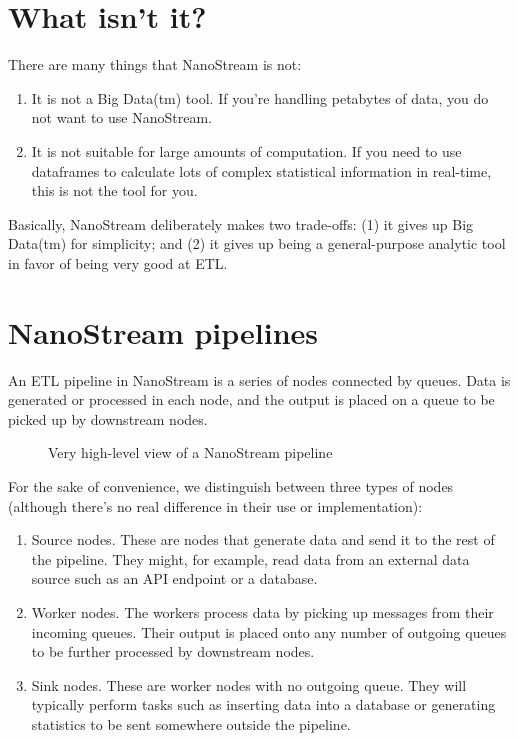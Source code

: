 \documentclass[letterpaper,10pt,english]{sphinxmanual}
\let\sphinxpxdimen\pdfpxdimen\else\newdimen\sphinxpxdimen
\begin{document}
\section{What isn’t it?}
\label{\detokenize{treehorn:what-isn-t-it}}
There are many things that NanoStream is not:
\begin{enumerate}
\def\theenumi{\arabic{enumi}}
\def\labelenumi{\theenumi .}
\makeatletter\def\p@enumii{\p@enumi \theenumi .}\makeatother
\item {} 
It is not a Big Data(tm) tool. If you’re handling petabytes of data, you do
not want to use NanoStream.

\item {} 
It is not suitable for large amounts of computation. If you need to use
dataframes to calculate lots of complex statistical information in real-time,
this is not the tool for you.

\end{enumerate}

Basically, NanoStream deliberately makes two trade-offs: (1) it gives up Big Data(tm) for simplicity; and (2) it gives up being a general-purpose analytic tool in favor of being very good at ETL.


\section{NanoStream pipelines}
\label{\detokenize{treehorn:nanostream-pipelines}}
An ETL pipeline in NanoStream is a series of nodes connected by queues. Data
is generated or processed in each node, and the output is placed on a queue to
be picked up by downstream nodes.

\begin{figure}[htbp]
\centering
\capstart

\noindent\sphinxincludegraphics[width=600\sphinxpxdimen]{{30k_view}.png}
\caption{Very high-level view of a NanoStream pipeline}\label{\detokenize{treehorn:id1}}\end{figure}

For the sake of convenience, we distinguish between three types of nodes
(although there’s no real difference in their use or implementation):
\begin{enumerate}
\def\theenumi{\arabic{enumi}}
\def\labelenumi{\theenumi .}
\makeatletter\def\p@enumii{\p@enumi \theenumi .}\makeatother
\item {} 
Source nodes. These are nodes that generate data and send it to the rest
of the pipeline. They might, for example, read data from an external
data source such as an API endpoint or a database.

\item {} 
Worker nodes. The workers process data by picking up messages from their
incoming queues. Their output is placed onto any number of outgoing queues
to be further processed by downstream nodes.

\item {} 
Sink nodes. These are worker nodes with no outgoing queue. They will
typically perform tasks such as inserting data into a database or generating
statistics to be sent somewhere outside the pipeline.

\end{enumerate}
\end{document}
